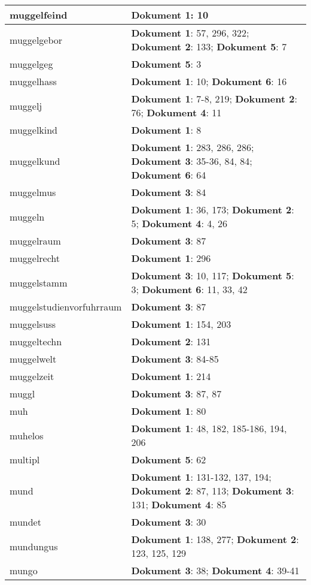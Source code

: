 \documentclass[a5paper]{article}
\begin{document}
\begin{longtable}[l]{|l|p{3in}|}
\hline
muggelfeind & \textbf{Dokument 1}: 10 \\
\hline
muggelgebor & \textbf{Dokument 1}: 57, 296, 322; \textbf{Dokument 2}: 133; \textbf{Dokument 5}: 7 \\
\hline
muggelgeg & \textbf{Dokument 5}: 3 \\
\hline
muggelhass & \textbf{Dokument 1}: 10; \textbf{Dokument 6}: 16 \\
\hline
muggelj & \textbf{Dokument 1}: 7-8, 219; \textbf{Dokument 2}: 76; \textbf{Dokument 4}: 11 \\
\hline
muggelkind & \textbf{Dokument 1}: 8 \\
\hline
muggelkund & \textbf{Dokument 1}: 283, 286, 286; \textbf{Dokument 3}: 35-36, 84, 84; \textbf{Dokument 6}: 64 \\
\hline
muggelmus & \textbf{Dokument 3}: 84 \\
\hline
muggeln & \textbf{Dokument 1}: 36, 173; \textbf{Dokument 2}: 5; \textbf{Dokument 4}: 4, 26 \\
\hline
muggelraum & \textbf{Dokument 3}: 87 \\
\hline
muggelrecht & \textbf{Dokument 1}: 296 \\
\hline
muggelstamm & \textbf{Dokument 3}: 10, 117; \textbf{Dokument 5}: 3; \textbf{Dokument 6}: 11, 33, 42 \\
\hline
muggelstudienvorfuhrraum & \textbf{Dokument 3}: 87 \\
\hline
muggelsuss & \textbf{Dokument 1}: 154, 203 \\
\hline
muggeltechn & \textbf{Dokument 2}: 131 \\
\hline
muggelwelt & \textbf{Dokument 3}: 84-85 \\
\hline
muggelzeit & \textbf{Dokument 1}: 214 \\
\hline
muggl & \textbf{Dokument 3}: 87, 87 \\
\hline
muh & \textbf{Dokument 1}: 80 \\
\hline
muhelos & \textbf{Dokument 1}: 48, 182, 185-186, 194, 206 \\
\hline
multipl & \textbf{Dokument 5}: 62 \\
\hline
mund & \textbf{Dokument 1}: 131-132, 137, 194; \textbf{Dokument 2}: 87, 113; \textbf{Dokument 3}: 131; \textbf{Dokument 4}: 85 \\
\hline
mundet & \textbf{Dokument 3}: 30 \\
\hline
mundungus & \textbf{Dokument 1}: 138, 277; \textbf{Dokument 2}: 123, 125, 129 \\
\hline
mungo & \textbf{Dokument 3}: 38; \textbf{Dokument 4}: 39-41 \\

\end{longtable}
\end{document}
